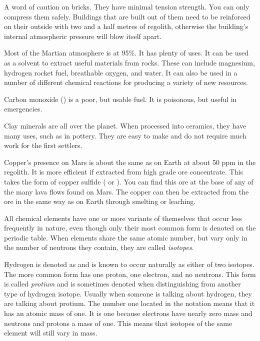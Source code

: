 A word of caution on bricks. They have minimal tension strength. You can only compress them safely. Buildings that are built out of them need to be reinforced on their outside with two and a half metres of regolith, otherwise the building's internal atmospheric pressure will blow itself apart.

Most of the Martian atmosphere is  at 95\%. It has plenty of uses. It can be used as a solvent to extract useful materials from rocks. These can include magnesium, hydrogen rocket fuel, breathable oxygen, and water. It can also be used in a number of different chemical reactions for producing a variety of new resources.

Carbon monoxide () is a poor, but usable fuel. It is poisonous, but useful in emergencies.

Clay minerals are all over the planet. When processed into ceramics, they have many uses, such as in pottery. They are easy to make and do not require much work for the first settlers.

Copper's presence on Mars is about the same as on Earth at about 50 ppm in the regolith. It is more efficient if extracted from high grade ore concentrate. This takes the form of copper sulfide ( or ). You can find this ore at the base of any of the many lava flows found on Mars. The copper can then be extracted from the ore in the same way as on Earth through smelting or leaching.

All chemical elements have one or more variants of themselves that occur less frequently in nature, even though only their most common form is denoted on the periodic table. When elements share the same atomic number, but vary only in the number of neutrons they contain, they are called {\it isotopes}.

Hydrogen is denoted as  and is known to occur naturally as either of two isotopes. The more common form has one proton, one electron, and no neutrons. This form is called {\it protium} and is sometimes denoted  when distinguishing from another type of hydrogen isotope. Usually when someone is talking about hydrogen, they are talking about protium. The number one located in the notation means that it has an atomic mass of one. It is one because electrons have nearly zero mass and neutrons and protons a mass of one. This means that isotopes of the same element will still vary in mass.

